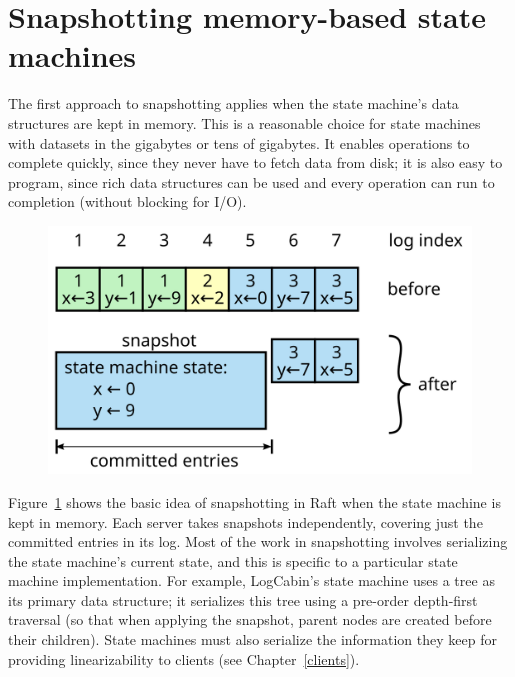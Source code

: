 \section{Snapshotting memory-based state machines}
\label{compaction:memsnapshot}

The first approach to snapshotting applies when the state machine's data
structures are kept in memory. This is a reasonable choice for state
machines with datasets in the gigabytes or tens of gigabytes. It
enables operations to complete quickly, since they never have to fetch
data from disk; it is also easy to program, since rich data
structures can be used and every operation can run to completion
(without blocking for I/O).

\begin{figure}
\centering
\includegraphics[scale=.50]{compaction/snapshot}
\label{fig:compaction:snapshot}
\end{figure}

Figure~\ref{fig:compaction:snapshot} shows the basic idea of
snapshotting in Raft when the state machine is kept in memory. Each
server takes snapshots independently, covering just the committed
entries in its log. Most of the work in snapshotting involves
serializing the state machine's current state, and this is specific to a
particular state machine implementation. For example, LogCabin's
state machine uses a tree as its primary data structure; it serializes
this tree using a pre-order depth-first traversal (so that when
applying the snapshot, parent nodes are created before their children).
State machines must also serialize the information they keep for
providing linearizability to clients (see Chapter~\ref{clients}).

